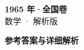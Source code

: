 \documentclass[zihao=-4, a4paper]{ctexart}
\begin{document}
\begin{center}
  {\Large\bfseries 1965 年·全国卷}\\[4pt]
  {\large 数学 · 解析版}
\end{center}
\medskip
{}

\clearpage
{}
\begin{center}{\Large\bfseries 参考答案与详细解析}\end{center}
\medskip

\end{document}
